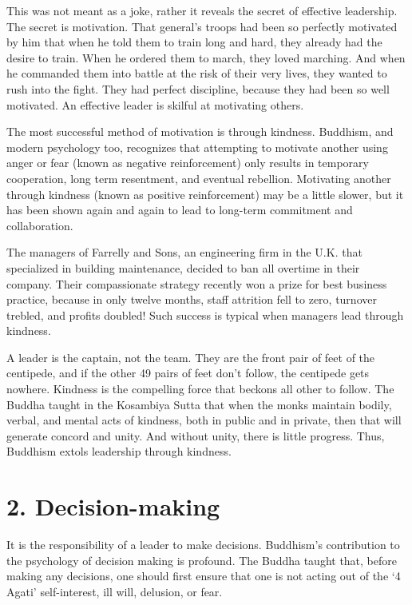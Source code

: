 \documentclass[12pt, openany]{book}
\begin{document}
This was not meant as a joke, rather it reveals the secret of effective leadership. The secret is motivation. That general’s troops had been so perfectly motivated by him that when he told them to train long and hard, they already had the desire to train. When he ordered them to march, they loved marching.  And when he commanded them into battle at the risk of their very lives, they wanted to rush into the fight. They had perfect discipline, because they had been so well motivated. An effective leader is skilful at motivating others.

The most successful method of motivation is through kindness. Buddhism, and modern psychology too, recognizes that attempting to motivate another using anger or fear (known as negative reinforcement) only results in temporary cooperation, long term resentment, and eventual rebellion. Motivating another through kindness (known as positive reinforcement) may be a little slower, but it has been shown again and again to lead to long-term commitment and collaboration.

The managers of Farrelly and Sons, an engineering firm in the U.K. that specialized in building maintenance, decided to ban all overtime in their company. Their compassionate strategy recently won a prize for best business practice, because in only twelve months, staff attrition fell to zero, turnover trebled, and profits doubled! Such success is typical when managers lead through kindness.

A leader is the captain, not the team. They are the front pair of feet of the centipede, and if the other 49 pairs of feet don’t follow, the centipede gets nowhere. Kindness is the compelling force that beckons all other to follow. The Buddha taught in the Kosambiya Sutta that when the monks maintain bodily, verbal, and mental acts of kindness, both in public and in private, then that will generate concord and unity. And without unity, there is little progress. Thus, Buddhism extols leadership through kindness.

\chapter{2. Decision-making}

It is the responsibility of a leader to make decisions. Buddhism’s contribution to the psychology of decision making is profound. The Buddha taught that, before making any decisions, one should first ensure that one is not acting out of the ‘4 Agati’ self-interest, ill will, delusion, or fear.
\end{document}
